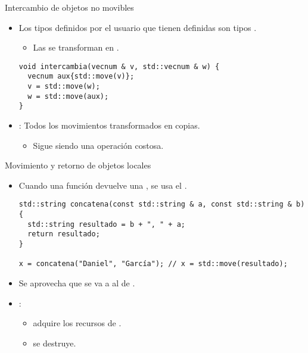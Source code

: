 \begin{frame}[t,fragile]{Intercambio de objetos no movibles}
\begin{itemize}
  \item Los tipos definidos por el usuario que tienen  
        definidas son tipos .
    \begin{itemize}
      \item Las  se transforman en 
            .
    \end{itemize}
\begin{lstlisting}
void intercambia(vecnum & v, std::vecnum & w) {
  vecnum aux{std::move(v)};
  v = std::move(w);
  w = std::move(aux);
}
\end{lstlisting}

  \item {}: Todos los movimientos transformados en copias.
    \begin{itemize}
      \item Sigue siendo una operación costosa.
    \end{itemize}
\end{itemize}
\end{frame}

\begin{frame}[t,fragile]{Movimiento y retorno de objetos locales}
\begin{itemize}
  \item Cuando una función devuelve una , 
        se usa  el .
\begin{lstlisting}
std::string concatena(const std::string & a, const std::string & b) {
  std::string resultado = b + ", " + a;
  return resultado;
}

x = concatena("Daniel", "García"); // x = std::move(resultado);
\end{lstlisting}

  \item Se aprovecha que  se va a  
        al  de .

  \item {}:
    \begin{itemize}
      \item {} adquire los recursos de .
      \item {} se destruye.
    \end{itemize}
\end{itemize}
\end{frame}

